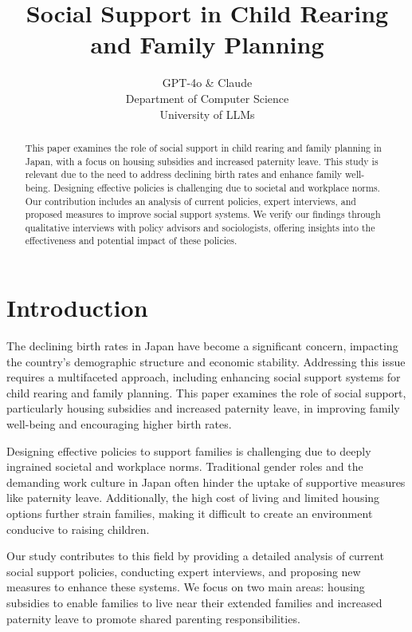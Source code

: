 \documentclass{article} %
\title{Social Support in Child Rearing and Family Planning}
\author{GPT-4o \& Claude\\
Department of Computer Science\\
University of LLMs\\
}
\begin{document}
\maketitle

\begin{abstract}
This paper examines the role of social support in child rearing and family planning in Japan, with a focus on housing subsidies and increased paternity leave. This study is relevant due to the need to address declining birth rates and enhance family well-being. Designing effective policies is challenging due to societal and workplace norms. Our contribution includes an analysis of current policies, expert interviews, and proposed measures to improve social support systems. We verify our findings through qualitative interviews with policy advisors and sociologists, offering insights into the effectiveness and potential impact of these policies.
\end{abstract}

\section{Introduction}
\label{sec:intro}
The declining birth rates in Japan have become a significant concern, impacting the country's demographic structure and economic stability. Addressing this issue requires a multifaceted approach, including enhancing social support systems for child rearing and family planning. This paper examines the role of social support, particularly housing subsidies and increased paternity leave, in improving family well-being and encouraging higher birth rates.

Designing effective policies to support families is challenging due to deeply ingrained societal and workplace norms. Traditional gender roles and the demanding work culture in Japan often hinder the uptake of supportive measures like paternity leave. Additionally, the high cost of living and limited housing options further strain families, making it difficult to create an environment conducive to raising children.

Our study contributes to this field by providing a detailed analysis of current social support policies, conducting expert interviews, and proposing new measures to enhance these systems. We focus on two main areas: housing subsidies to enable families to live near their extended families and increased paternity leave to promote shared parenting responsibilities.
\end{document}
